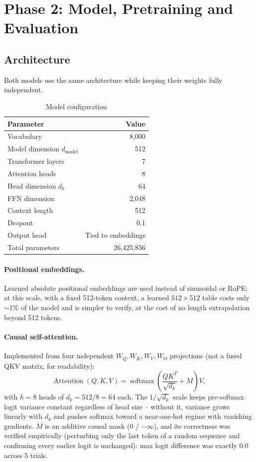 \documentclass[10pt,a4paper]{article}
\begin{document}
\section{Phase 2: Model, Pretraining and Evaluation}

\subsection{Architecture}
Both models use the same architecture while
keeping their weights fully independent.

\begin{table}[H]\centering
\caption{Model configuration}
\label{tab:model-config}
\small
\begin{tabular}{lr}\toprule
Parameter & Value\\\midrule
Vocabulary & 8,000\\
Model dimension $d_{\text{model}}$ & 512\\
Transformer layers & 7\\
Attention heads & 8\\
Head dimension $d_k$ & 64\\
FFN dimension & 2,048\\
Context length & 512\\
Dropout & 0.1\\
Output head & Tied to embeddings\\
Total parameters & 26,425,856\\
\bottomrule\end{tabular}
\end{table}

\paragraph{Positional embeddings.} Learned absolute positional embeddings
are used instead of sinusoidal or RoPE: at this scale, with a fixed 512-token
context, a learned $512\times512$ table costs only $\sim$1\% of the model
and is simpler to verify, at the cost of no length extrapolation beyond 512
tokens.

\paragraph{Causal self-attention.} Implemented from four independent
$W_Q,W_K,W_V,W_O$ projections (not a fused QKV matrix, for readability):
\[
\operatorname{Attention}(Q,K,V)=
\operatorname{softmax}\!\left(\frac{QK^T}{\sqrt{d_k}}+M\right)V,
\]
with $h=8$ heads of $d_k=512/8=64$ each. The
$1/\sqrt{d_k}$ scale keeps pre-softmax logit variance constant regardless of
head size -- without it, variance grows linearly with $d_k$ and pushes
softmax toward a near-one-hot regime with vanishing gradients. $M$ is an
additive causal mask ($0$ / $-\infty$), and its correctness was verified
empirically (perturbing only the last token of a random sequence and
confirming every earlier logit is unchanged): max logit difference was
exactly $0.0$ across 5 trials.
\end{document}
